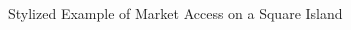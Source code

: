 \documentclass[notes,11pt, aspectratio=169]{beamer}
\begin{document}
\begin{frame}{ Stylized Example of Market Access on a Square Island}
\begin{columns}[T]
\begin{column}{.45\textwidth}
{{{    }}}
\end{column}%
\end{columns}
\end{frame}
\end{document}
